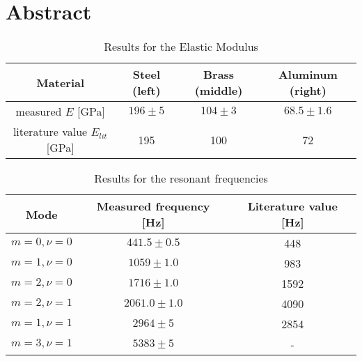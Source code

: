 \section*{Abstract}

\begin{table}[h!]
	\centering
	\begin{tabular}{c|c|c|c}
		Material							& Steel (left)	& Brass (middle)	& Aluminum (right)\\ \hline\hline
		measured $E$ [GPa]			& $196\pm5$	& 	$104\pm3$		& $68.5\pm1.6$			\\ \hline
		literature value \cite{staats} $E_{lit}$ [GPa]	& 195			& 100				& 72
	\end{tabular}
	\caption{Results for the Elastic Modulus}
\end{table}

\begin{table}
	\centering
	\begin{tabular}{c|c|c}
		Mode 		& Measured frequency [Hz] 	& Literature value [Hz]\\ \hline\hline
		$m=0,\nu=0$	& $441.5\pm0.5$					& 448	\\ \hline
		$m=1,\nu=0$	& $1059\pm1.0$				& 983	\\ \hline
		$m=2,\nu=0$	& $1716\pm1.0$				& 1592	\\ \hline
		$m=2,\nu=1$	& $2061.0\pm1.0$				& 4090	\\ \hline
		$m=1,\nu=1$	& $2964\pm5$				& 2854 \\ \hline
		$m=3,\nu=1$	& $5383\pm5$				&-
	\end{tabular}
	\caption{Results for the resonant frequencies}
\end{table}